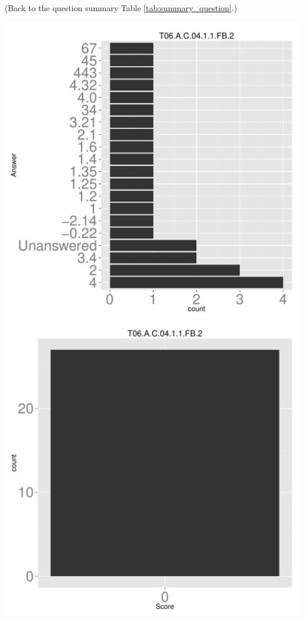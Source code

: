 \documentclass[12pt,nohyper]{tufte-handout}\usepackage[]{graphicx}\usepackage[]{color}
\begin{document}
 (Back to the question summary Table \ref{tab:summary_question}.)

\begin{center} \includegraphics[width=.45\linewidth]{Topic06_10_answer} \includegraphics[width=.45\linewidth]{Topic06_10_score} \end{center} 
\end{document}
